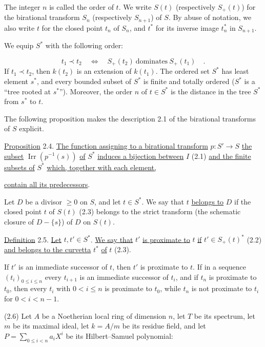 The integer $n$ is called the order of $t$.  We write $S(t)$ (respectively
$S_+(t)$) for the birational transform $S_n$ (respectively $S_{n+1}$) of $S$.
By abuse of notation, we also write $t$ for the closed point $t_n$ of $S_n$, and
$t^*$ for its inverse image $t_n^*$ in $S_{n+1}$.

We equip $S^*$ with the following order:

\begin{equation*}
t_1\prec t_2
\quad\Longleftrightarrow\quad
S_+(t_2)\ \text{dominates}\ S_+(t_1) \quad .
\end{equation*}
If $t_1\prec t_2$, then $k(t_2)$ is an extension of $k(t_1)$.  The ordered set
$S^*$ has least element $s^*$, and every bounded subset of $S^*$ is finite and
totally ordered ($S^*$ is a ``tree rooted at $s^*$'').  Moreover, the order $n$ of
$t\in S^*$ is the distance in the tree $S^*$ from $s^*$ to $t$.

The following proposition makes the description 2.1 of the birational
transforms of $S$ explicit.

\underline{Proposition} 2.4. \underline{The function assigning to a birational
transform} $p:S'\to S$ \underline{the subset}
$\operatorname{Irr}(p^{-1}(s))$ \underline{of} $S^*$ \underline{induces a
bijection between} $I$ (2.1) \underline{and the finite subsets of} $S^*$
\underline{which, together with each element,}


\underline{contain all its predecessors}.

Let $D$ be a divisor $\geq0$ on $S$, and let $t\in S^*$.  We say that $t$
\underline{belongs to} $D$ if the closed point $t$ of $S(t)$ (2.3) belongs to the
strict transform (the schematic closure of $D-\{s\}$) of $D$ on $S(t)$.

\underline{Definition} 2.5. \underline{Let} $t,t'\in S^*$.
\underline{We say that} $t'$ \underline{is proximate to} $t$ \underline{if}
$t'\in S_+(t)^*$ (2.2) \underline{and belongs to the curvetta} $t^*$ \underline{of}
$t$ (2.3).

If $t'$ is an immediate successor of $t$, then $t'$ is proximate to $t$.  If in a
sequence $(t_i)_{0\leq i\leq n}$ every $t_{i+1}$ is an immediate successor of
$t_i$, and if $t_n$ is proximate to $t_0$, then every $t_i$ with $0<i\leq n$ is
proximate to $t_0$, while $t_n$ is not proximate to $t_i$ for
$0<i<n-1$.

(2.6) Let $A$ be a Noetherian local ring of dimension $n$, let $T$ be its
spectrum, let $m$ be its maximal ideal, let $k=A/m$ be its residue field, and let
$P=\sum_{0\leq i<n}a_iX^i$ be its Hilbert--Samuel polynomial:

